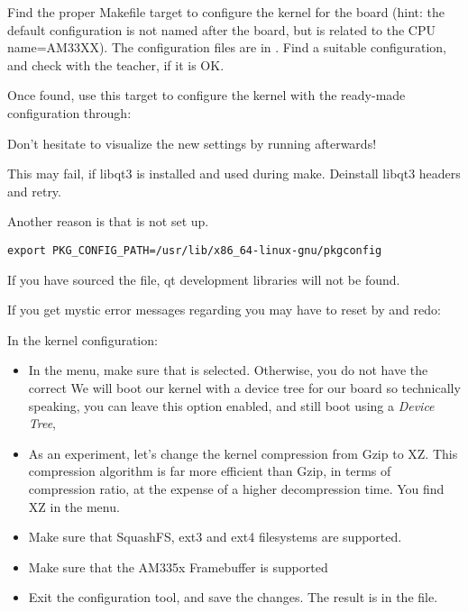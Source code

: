 Find the proper Makefile target to configure the kernel for the \devboard board 
(hint: the default configuration is not named after the board, but is related to the CPU
name=AM33XX). The configuration files are in .
Find a suitable configuration, and check with the teacher, if it is OK.

Once found, use this target to configure the kernel with the
ready-made configuration through:


Don't hesitate to visualize the new settings by running
 afterwards!

This may fail, if libqt3 is installed and used during make.
Deinstall libqt3 headers and retry.

Another reason is that  is not set up.

\begin{verbatim}
export PKG_CONFIG_PATH=/usr/lib/x86_64-linux-gnu/pkgconfig
\end{verbatim}


If you have sourced the file, qt development libraries will not be found.

If you get mystic error messages regarding 
you may have to reset by  and redo:


In the kernel configuration:

\begin{itemize}

\item In the  menu, make sure that  is selected.
  Otherwise, you do not have the correct 
  We will boot our kernel with a device tree for our board so
  technically speaking, you can leave this option enabled,
  and still boot using a {\em Device Tree}, 

\item As an experiment, let's change the kernel compression from Gzip
  to XZ. This compression algorithm is far more efficient than Gzip,
  in terms of compression ratio, at the expense of a higher
  decompression time. You find XZ in the  menu.

\item Make sure that SquashFS, ext3 and ext4 filesystems are supported.

\item Make sure that the AM335x Framebuffer is supported

\item Exit the configuration tool, and save the changes.  The result
  is in the  file.

\end{itemize}

